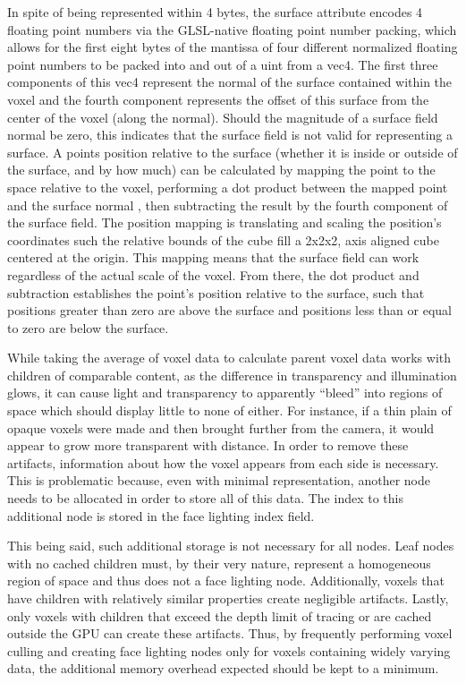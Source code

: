 \documentclass[onecolumn, draftclsnofoot,10pt, compsoc]{IEEEtran}
\newcounter{threesection}[subsubsection]
\newcounter{foursection}[threesection]
\begin{document}

In spite of being represented within 4 bytes, the surface attribute encodes 4 floating point numbers via the GLSL-native floating point number packing, which allows for the first eight bytes of the mantissa of four different normalized floating point numbers to be packed into and out of a uint from a vec4. The first three components of this vec4 represent the normal of the surface contained within the voxel and the fourth component represents the offset of this surface from the center of the voxel (along the normal). Should the magnitude of a surface field  normal be zero, this indicates that the surface field is not valid for representing a surface.
A points position relative to the surface (whether it is inside or outside of the surface, and by how much) can be calculated by mapping the point to the space relative to the voxel, performing a dot product between the mapped point and the surface normal , then subtracting the result by the fourth component of the surface field. The position mapping is translating and scaling the position’s coordinates such the relative bounds of the cube fill a 2x2x2, axis aligned cube centered at the origin. This mapping means that the surface field can work regardless of the actual scale of the voxel. From there, the dot product and subtraction establishes the point’s position relative to the surface, such that positions greater than zero are above the surface and positions less than or equal to zero are below the surface. 


While taking the average of voxel data to calculate parent voxel data works with children of comparable content, as the difference in transparency and illumination glows, it can cause light and transparency to apparently “bleed” into regions of space which should display little to none of either. For instance, if a thin plain of opaque voxels were made and then brought further from the camera, it would appear to grow more transparent with distance. In order to remove these artifacts, information about how the voxel appears from each side is necessary. This is problematic because, even with minimal representation, another node needs to be allocated in order to store all of this data. The index to this additional node is stored in the face lighting index field.

This being said, such additional storage is not necessary for all nodes. Leaf nodes with no cached children must, by their very nature, represent a homogeneous region of space and thus does not a face lighting node. Additionally, voxels that have children with relatively similar properties create negligible artifacts. Lastly, only voxels with children that exceed the depth limit of tracing or are cached outside the GPU can create these artifacts. Thus, by frequently performing voxel culling and creating face lighting nodes only for voxels containing widely varying data, the additional memory overhead expected should be kept to a minimum.
\end{document}
